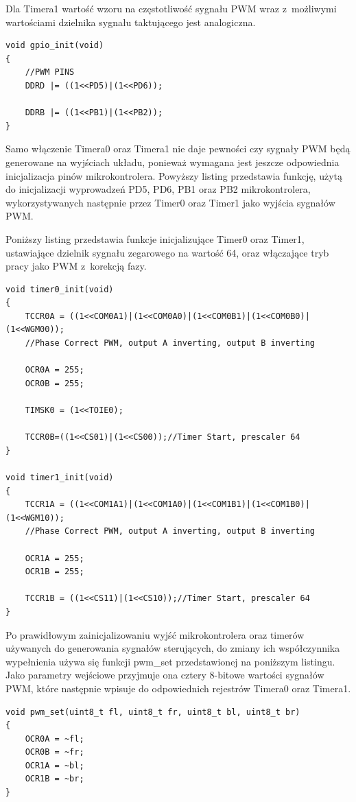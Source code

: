 \documentclass[11pt, twoside]{Thesis} %
\begin{document}
Dla Timera1 wartość wzoru na częstotliwość sygnału PWM wraz z~możliwymi wartościami dzielnika sygnału taktującego jest analogiczna.

\begin{lstlisting}
void gpio_init(void)
{
	//PWM PINS
	DDRD |= ((1<<PD5)|(1<<PD6));

	DDRB |= ((1<<PB1)|(1<<PB2));
}
\end{lstlisting}

Samo włączenie Timera0 oraz Timera1 nie daje pewności czy sygnały PWM będą generowane na wyjściach układu, ponieważ wymagana jest jeszcze odpowiednia inicjalizacja pinów mikrokontrolera. Powyższy listing przedstawia funkcję, użytą do inicjalizacji wyprowadzeń PD5, PD6, PB1 oraz PB2 mikrokontrolera, wykorzystywanych następnie przez Timer0 oraz Timer1 jako wyjścia sygnałów PWM. 


Poniższy listing przedstawia funkcje inicjalizujące Timer0 oraz Timer1, ustawiające dzielnik sygnału zegarowego na wartość 64, oraz włączające tryb pracy jako PWM z~korekcją fazy.

\begin{lstlisting}
void timer0_init(void)
{
	TCCR0A = ((1<<COM0A1)|(1<<COM0A0)|(1<<COM0B1)|(1<<COM0B0)|(1<<WGM00));
	//Phase Correct PWM, output A inverting, output B inverting

	OCR0A = 255;
	OCR0B = 255;

	TIMSK0 = (1<<TOIE0);

	TCCR0B=((1<<CS01)|(1<<CS00));//Timer Start, prescaler 64
}

void timer1_init(void)
{
	TCCR1A = ((1<<COM1A1)|(1<<COM1A0)|(1<<COM1B1)|(1<<COM1B0)|(1<<WGM10));
	//Phase Correct PWM, output A inverting, output B inverting

	OCR1A = 255;
	OCR1B = 255;

	TCCR1B = ((1<<CS11)|(1<<CS10));//Timer Start, prescaler 64
}
\end{lstlisting}




Po prawidłowym zainicjalizowaniu wyjść mikrokontrolera oraz timerów używanych do generowania sygnałów sterujących, do zmiany ich współczynnika wypełnienia używa się funkcji pwm\_set przedstawionej na poniższym listingu. Jako parametry wejściowe przyjmuje ona cztery 8-bitowe wartości sygnałów PWM, które następnie wpisuje do odpowiednich rejestrów Timera0 oraz Timera1.

\begin{lstlisting}
void pwm_set(uint8_t fl, uint8_t fr, uint8_t bl, uint8_t br)
{
	OCR0A = ~fl;
	OCR0B = ~fr;
	OCR1A = ~bl;
	OCR1B = ~br;
}
\end{lstlisting}
\end{document}
